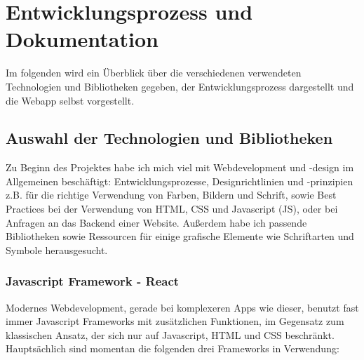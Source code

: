 \chapter{Entwicklungsprozess und Dokumentation}

Im folgenden wird ein Überblick über die verschiedenen verwendeten Technologien und Bibliotheken gegeben, der Entwicklungsprozess dargestellt und die Webapp selbst vorgestellt.

\section{Auswahl der Technologien und Bibliotheken}

Zu Beginn des Projektes habe ich mich viel mit Webdevelopment und -design im Allgemeinen beschäftigt: Entwicklungsprozesse, Designrichtlinien und -prinzipien z.B. für die richtige Verwendung von Farben, Bildern und Schrift, sowie Best Practices bei der Verwendung von HTML, CSS und Javascript (JS), oder bei Anfragen an das Backend einer Website. Außerdem habe ich passende Bibliotheken sowie Ressourcen für einige grafische Elemente wie Schriftarten und Symbole herausgesucht. 

\subsection{Javascript Framework - React}

Modernes Webdevelopment, gerade bei komplexeren Apps wie dieser, benutzt fast immer Javascript Frameworks mit zusätzlichen Funktionen, im Gegensatz zum klassischen Ansatz, der sich nur auf Javascript, HTML und CSS beschränkt. Hauptsächlich sind momentan die folgenden drei Frameworks in Verwendung:

